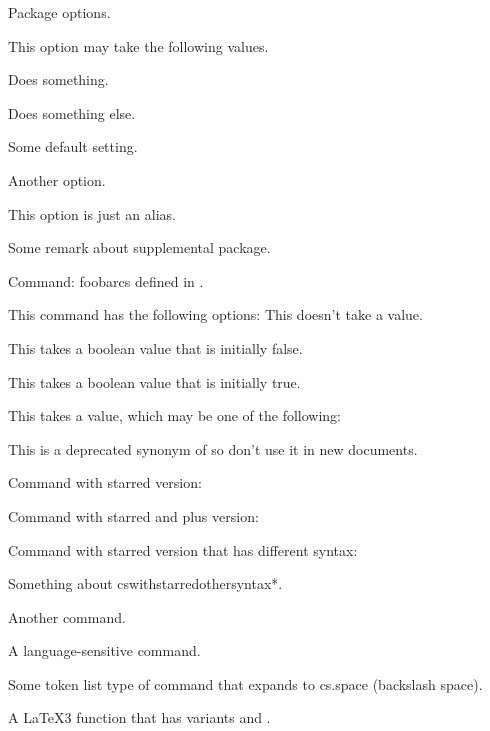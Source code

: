 \documentclass[titlepage=false,oneside,
 fontsize=12pt,captions=tableheading]{scrbook}
\begin{document}

Package options.

This option may take the following values.

Does something.

Does something else.

Some default setting.

Another option.

This option is just an alias.

Some remark about supplemental package.

Command: \gls{foobarcs} defined in .


This command has the following options:
This doesn't take a value.

This takes a boolean value that is initially false.

This takes a boolean value that is initially true.

This takes a value, which may be one of the following:


This is a deprecated synonym of
 so don't use it in new
documents.

Command with starred version:


Command with starred and plus version:


Command with starred version that has different syntax:


Something about \gls{cswithstarredothersyntax*}.

Another command.

A language-sensitive command.

Some token list type of command that expands to \gls{cs.space}
(backslash space).

A \LaTeX3 function that has variants  and
.
\end{document}

